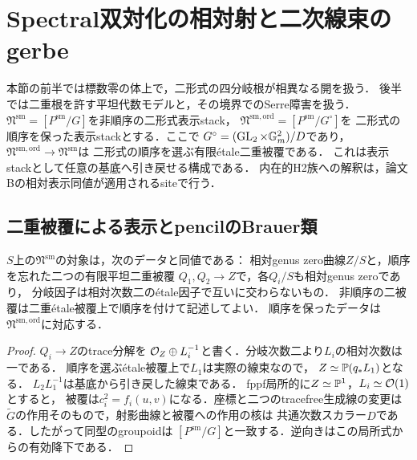 \section{Spectral双対化の相対射と二次線束のgerbe}
\label{sec:qa-spectral-relative-nonfaithful-map}

本節の前半では標数零の体上で，二形式の四分岐根が相異なる開を扱う．
後半では二重根を許す平坦代数モデルと，その境界でのSerre障害を扱う．
$\mathfrak N^{\mathrm{sm}}=[P^{\mathrm{sm}}/G]$を非順序の二形式表示stack，
$\mathfrak N^{\mathrm{sm,ord}}=[P^{\mathrm{sm}}/G^\circ]$を
二形式の順序を保った表示stackとする．ここで
$G^\circ=(\operatorname{GL}_2\times\mathbb G_m^2)/D$であり，
$\mathfrak N^{\mathrm{sm,ord}}\to\mathfrak N^{\mathrm{sm}}$は
二形式の順序を選ぶ有限\'etale二重被覆である．
これは表示stackとして任意の基底へ引き戻せる構成である．
内在的H2族への解釈は，論文Bの相対表示同値が適用されるsiteで行う．

\subsection{二重被覆による表示とpencilのBrauer類}

\begin{lemma}[二conic被覆のgroupoid]
\label{lem:qa-rootpair-double-cover-groupoid}
$S$上の$\mathfrak N^{\mathrm{sm}}$の対象は，次のデータと同値である：
相対genus zero曲線$Z/S$と，順序を忘れた二つの有限平坦二重被覆
$Q_1,Q_2\to Z$で，各$Q_i/S$も相対genus zeroであり，
分岐因子は相対次数二の\'etale因子で互いに交わらないもの．
非順序の二被覆は二重\'etale被覆上で順序を付けて記述してよい．
順序を保ったデータは$\mathfrak N^{\mathrm{sm,ord}}$に対応する．
\end{lemma}
\begin{proof}
$Q_i\to Z$のtrace分解を
$\mathcal O_Z\oplus L_i^{-1}$と書く．分岐次数二より$L_i$の相対次数は一である．
順序を選ぶ\'etale被覆上で$L_1$は実際の線束なので，
$Z\simeq\mathbb P(q_*L_1)$となる．
$L_2L_1^{-1}$は基底から引き戻した線束である．
fppf局所的に$Z\simeq\mathbb P^1$，$L_i\simeq\mathcal O(1)$とすると，
被覆は$c_i^2=f_i(u,v)$になる．座標と二つのtracefree生成線の変更は
$\widetilde G$の作用そのもので，射影曲線と被覆への作用の核は
共通次数スカラー$D$である．したがって同型のgroupoidは
$[P^{\mathrm{sm}}/G]$と一致する．逆向きはこの局所式からの有効降下である．
\end{proof}


